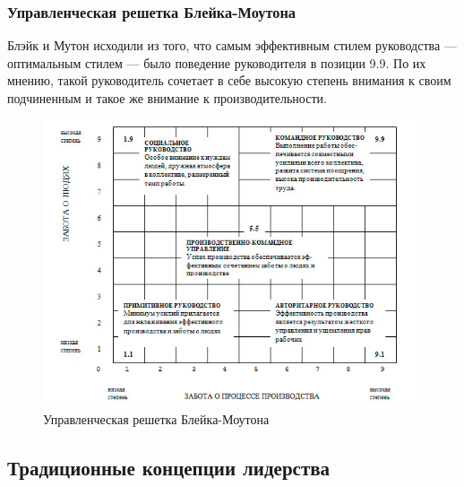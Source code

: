 \documentclass[a4paper,12pt,oneside,final]{extarticle}
\makeatletter
\numberwithin{equation}{section}
\def\maxwidth#1{\ifdim\Gin@nat@width>#1 #1\else\Gin@nat@width\fi}
\makeatother
\begin{document}
\subsubsection{Управленческая решетка Блейка-Моутона}
Блэйк и Мутон исходили из того, что самым эффективным стилем руководства --- оптимальным стилем --- было поведение руководителя в позиции 9.9. 
По их мнению, такой руководитель сочетает в себе высокую степень внимания к своим подчиненным и такое же внимание к производительности.

\begin{figure}[h]
	\centering
	\includegraphics[width=\maxwidth{\textwidth}]{management-figures/leadership_lattice}
	\caption{Управленческая решетка Блейка-Моутона}
	\label{leadership_lattice}
\end{figure}

\subsection{Традиционные концепции лидерства}
\end{document}
